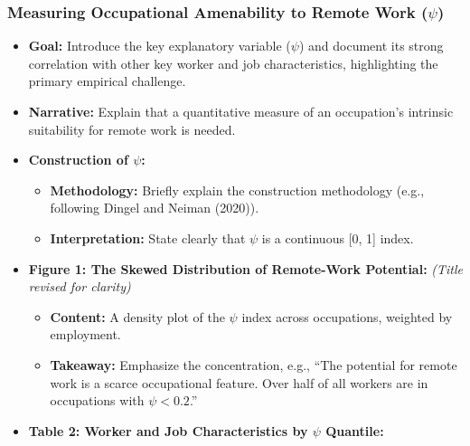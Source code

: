 \documentclass[
  11pt,
  letterpaper,
  DIV=11,
  numbers=noendperiod]{scrartcl}
\providecommand{\tightlist}{%
  \setlength{\itemsep}{0pt}\setlength{\parskip}{0pt}}\usepackage{longtable,booktabs,array}
\begin{document}
\subsubsection{\texorpdfstring{\textbf{Measuring Occupational
Amenability to Remote Work
(\(\psi\))}}{Measuring Occupational Amenability to Remote Work (\textbackslash psi)}}\label{measuring-occupational-amenability-to-remote-work-psi}

\begin{itemize}
\tightlist
\item
  \textbf{Goal:} Introduce the key explanatory variable (\(\psi\)) and
  document its strong correlation with other key worker and job
  characteristics, highlighting the primary empirical challenge.
\item
  \textbf{Narrative:} Explain that a quantitative measure of an
  occupation's intrinsic suitability for remote work is needed.
\item
  \textbf{Construction of \(\psi\):}

  \begin{itemize}
  \tightlist
  \item
    \textbf{Methodology:} Briefly explain the construction methodology
    (e.g., following Dingel and Neiman (2020)).
  \item
    \textbf{Interpretation:} State clearly that \(\psi\) is a continuous
    {[}0, 1{]} index.
  \end{itemize}
\item
  \textbf{Figure 1: The Skewed Distribution of Remote-Work Potential:}
  \emph{(Title revised for clarity)}

  \begin{itemize}
  \tightlist
  \item
    \textbf{Content:} A density plot of the \(\psi\) index across
    occupations, weighted by employment.
  \item
    \textbf{Takeaway:} Emphasize the concentration, e.g., ``The
    potential for remote work is a scarce occupational feature. Over
    half of all workers are in occupations with \(\psi < 0.2\).''
  \end{itemize}
\item
  \textbf{Table 2: Worker and Job Characteristics by \(\psi\) Quantile:}


\end{itemize}
\end{document}
